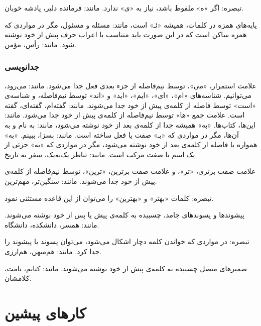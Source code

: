 تبصره‌: اگر «ه» ملفوظ باشد، نیاز به «‌ی» ندارد. مانند: فرمانده دلیر، پادشه خوبان.

پایه‌های همزه در کلمات، همیشه «ئـ» است، مانند: مسئله و مسئول، مگر در مواردی که همزه ساکن است که در این ‌صورت باید متناسب با اعراب حرف پیش از خود نوشته شود. مانند: رأس، مؤمن.



\subsubsection{جدانویسی}



علامت استمرار، «می»، توسط نیم‌فاصله از جزء‌ بعدی فعل جدا می‌شود. مانند: می‌رود، می‌توانیم.
شناسه‌های «ام»، «ای»، «ایم»، «اید» و «اند» توسط نیم‌فاصله، و شناسه‌ی «است» توسط فاصله از کلمه‌ی پیش از خود جدا می‌شوند. مانند: گفته‌ام، گفته‌ای، گفته است.
علامت جمع «ها» توسط نیم‌فاصله از کلمه‌ی پیش از خود جدا می‌شود. مانند: این‌ها، کتاب‌ها.
«به» همیشه جدا از کلمه‌ی بعد از خود نوشته می‌شود، مانند: به‌ نام و به آن‌ها، مگر در مواردی که «بـ» صفت یا فعل ساخته است. مانند: بسزا، ببینم.
«به» همواره با فاصله از کلمه‌ی بعد از خود نوشته می‌شود، مگر در مواردی که «به» جزئی از یک اسم یا صفت مرکب است. مانند: تناظر یک‌به‌یک، سفر به تاریخ.
%
%
%

%

علامت صفت برتری، «تر»، و علامت صفت برترین، «ترین»، توسط نیم‌فاصله از کلمه‌ی پیش از خود جدا می‌شوند.
مانند: سنگین‌تر، مهم‌ترین.

تبصره‌: کلمات «بهتر» و «بهترین» را می‌توان از این قاعده مستثنی نمود.

پیشوندها و پسوندهای جامد، چسبیده به کلمه‌ی پیش یا پس از خود نوشته می‌شوند. مانند: همسر، دانشکده، دانشگاه.

تبصره‌: در مواردی که خواندن کلمه دچار اشکال می‌شود، می‌توان پسوند یا پیشوند را جدا کرد. مانند: هم‌میهن، هم‌ارزی.

ضمیرهای متصل چسبیده به کلمه‌ی پیش‌ از خود نوشته می‌شوند. مانند: کتابم، نامت، کلامشان.





\section{کارهای پیشین}


